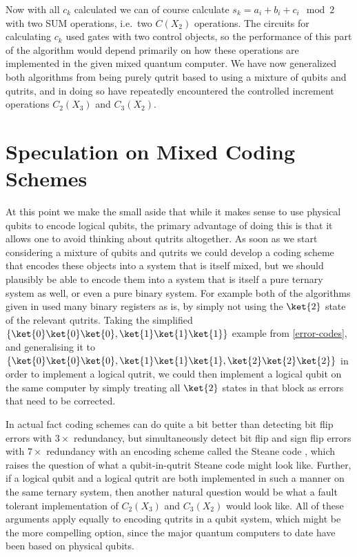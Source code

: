 Now with all $c_k$ calculated we can of course calculate $s_k = a_i + b_i + c_i \mod 2$ with two SUM operations, i.e.\ two $C(X_2)$ operations. The circuits for calculating $c_k$ used gates with two control objects, so the performance of this part of the algorithm would depend primarily on how these operations are implemented in the given mixed quantum computer. We have now generalized both algorithms from being purely qutrit based to using a mixture of qubits and qutrits, and in doing so have repeatedly encountered the controlled increment operations $C_2(X_3)$ and $C_3(X_2)$.

\section{Speculation on Mixed Coding Schemes}
At this point we make the small aside that while it makes sense to use physical qubits to encode logical qubits, the primary advantage of doing this is that it allows one to avoid thinking about qutrits altogether. As soon as we start considering a mixture of qubits and qutrits we could develop a coding scheme that encodes these objects into a system that is itself mixed, but we should plausibly be able to encode them into a system that is itself a pure ternary system as well, or even a pure binary system. For example both of the algorithms given in \cite{arithmetics} used many binary registers as is, by simply not using the $\ket{2}$ state of the relevant qutrits. Taking the simplified $\{\ket{0}\ket{0}\ket{0}, \ket{1}\ket{1}\ket{1}\}$ example from \autoref{error-codes}, and generalising it to $\{\ket{0}\ket{0}\ket{0}, \ket{1}\ket{1}\ket{1}, \ket{2}\ket{2}\ket{2}\}$ in order to implement a logical qutrit, we could then implement a logical qubit on the same computer by simply treating all $\ket{2}$ states in that block as errors that need to be corrected.

In actual fact coding schemes can do quite a bit better than detecting bit flip errors with $3\times$ redundancy, but simultaneously detect bit flip and sign flip errors with $7\times$ redundancy with an encoding scheme called the Steane code \cite{steane-code}, which raises the question of what a qubit-in-qutrit Steane code might look like. Further, if a logical qubit and a logical qutrit are both implemented in such a manner on the same ternary system, then another natural question would be what a fault tolerant implementation of $C_2(X_3)$ and $C_3(X_2)$ would look like. All of these arguments apply equally to encoding qutrits in a qubit system, which might be the more compelling option, since the major quantum computers to date have been based on physical qubits.

